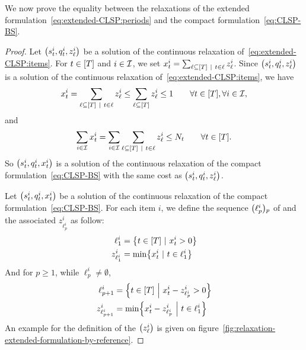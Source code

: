 We now prove the equality between the relaxations of the extended formulation~\eqref{eq:extended-CLSP:periods} and the compact formulation~\eqref{eq:CLSP-BS}.


\begin{proof}
Let $\bracket{\inventory_t^i, \quantity_t^i, z_{\ell}^i}$ be a solution of the continuous relaxation of~\eqref{eq:extended-CLSP:items}.
For $t\in\range{\horizon}$ and $i\in\mathcal{I}$, we set $\setup_t^i=\sum_{\ell\subseteq\range{\horizon}~|~t\in\ell} z_{\ell}^i$.
Since $\bracket{\inventory_t^i, \quantity_t^i, z_{\ell}^i}$ is a solution of the continuous relaxation of~\eqref{eq:extended-CLSP:items}, we have
\begin{equation}
\setup_t^i
= \sum_{\ell\subseteq\range{\horizon}~|~t\in\ell} z_{\ell}^i
\le \sum_{\ell\subseteq\range{\horizon}} z_{\ell}^i
\le 1
\qquad \forall t\in\range{\horizon},\forall i\in\REF,
\end{equation}
and
\begin{equation}
\sum_{i\in\REF}\setup_t^i
= \sum_{i\in\REF}\sum_{\ell\subseteq\range{\horizon}~|~t\in\ell} z_{\ell}^i
\le \nbsetups_t
\qquad \forall t\in\range{\horizon}.
\end{equation}
So $\bracket{\inventory_t^i, \quantity_t^i, \setup_t^i}$  is a solution of the continuous relaxation of the compact formulation~\eqref{eq:CLSP-BS} with the same cost as $\bracket{\inventory_t^i, \quantity_t^i, z_{\ell}^i}$.


Let $\bracket{\inventory_t^i, \quantity_t^i, \setup_t^i}$ be a solution of the continuous relaxation of the compact formulation~\eqref{eq:CLSP-BS}. For each item $i$, we define the sequence $\bracket{\ell_p^i}_p$ of and the associated $z_{\ell_p^i}^i$ as follow:
\begin{equation}
  \begin{aligned}
  \ell_1^i       &= \crbracket{t\in\range{\horizon}~|~\setup_t^i>0} \\
  z_{\ell_1^i}^i &= \min\crbracket{\setup_t^i~|~t\in\ell_1^i}
  \end{aligned}
\end{equation}
And for $p\ge1$, while $\ell_p^i\ne\emptyset$,
\begin{equation}
  \begin{aligned}
  \ell_{p+1}^i       &= \crbracket{t\in\range{\horizon}~\Big|~\setup_t^i-z_{\ell_p^i}^i>0} \\
  z_{\ell_{p+1}^i}^i &= \min\crbracket{\setup_t^i-z_{\ell_p^i}^i~\Big|~t\in\ell_1^i}
  \end{aligned}
\end{equation}
An example for the definition of the $\bracket{z_{\ell}^i}$ is given on figure~\cref{fig:relaxation-extended-formulation-by-reference}.


\end{proof}
